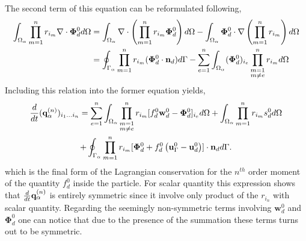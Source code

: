 The second term of this equation can be reformulated following,
\begin{align*}
    \int_{\Omega_{\alpha}}  \prod_{m=1}^{n} r_{i_m} \mathbf{\nabla}\cdot\bm\Phi_d^0  d\Omega
    &= \int_{\Omega_{\alpha}}  \mathbf{\nabla}\cdot \left(\prod_{m=1}^{n} r_{i_m} \bm\Phi_d^0 \right) d\Omega
    - \int_{\Omega_{\alpha}}  \bm\Phi_d^0 \cdot \mathbf{\nabla} \left(\prod_{m=1}^{n} r_{i_m} \right) d\Omega\\
    &= \oint_{\Gamma_{\alpha}}  \prod_{m=1}^{n} r_{i_m} (\bm\Phi_d^0 \cdot \textbf{n}_d) d\Gamma
    -\sum_{e=1}^{n} 
    \int_{\Omega_{\alpha}}  (\bm\Phi_d^0)_{i_e}  \prod^{n}_{\substack{ m=1 \\m \neq e}} r_{i_m}   d\Omega
\end{align*}
Including this relation into the former equation yields, 
\begin{multline}
    \ddt {(\textbf{q}_\alpha^{(n)})_{i_1\ldots i_n}}
    = \sum_{e=1}^{n} 
    \intO{
        \prod^{n}_{\substack{ m=1 \\m \neq e}} r_{i_m} [f_d^0 \textbf{w}_d^0  - \bm\Phi_d^0]_{i_e}
    }
    + \intO{ \pri{1}{n} s_d^0 }\\
    +\intS{ \pri{1}{n} [\bm\Phi_d^0 + f_d^0 \left(\textbf{u}_\Gamma^0 - \textbf{u}_d^0\right)]\cdot \textbf{n}_d }.
    \label{eq:dt_q_n}
\end{multline}
which is the final form of the Lagrangian conservation for the $n^{th}$ order moment of the quantity $f_d^0$ inside the particle. 
For scalar quantity this expression shows that $\frac{d}{dt} \textbf{q}_\alpha^{(n)}$ is entirely symmetric since it involve only product of the $r_{i_n}$ with scalar quantity. 
Regarding the seemingly non-symmetric terms involving $\textbf{w}_d^0$ and $\bm\Phi_d^0$ one can notice that due to the presence of the summation these terms turns out to be symmetric. 



